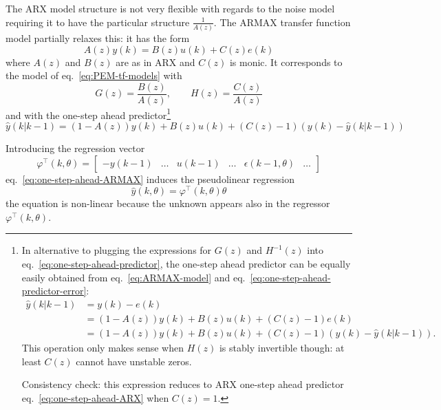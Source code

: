 The ARX model structure is not very flexible with regards to the noise model requiring it to have the particular structure $\frac{1}{A(z)}$. The ARMAX transfer function model partially relaxes this: it has the form
\begin{equation}
  \label{eq:ARMAX-model}
  A(z)y(k) = B(z)u(k) + C(z)e(k)
\end{equation}
where $A(z)$ and $B(z)$ are as in ARX and $C(z)$ is monic. It corresponds to the model of eq.~\eqref{eq:PEM-tf-models} with
\begin{equation*}
  G(z) = \frac{B(z)}{A(z)},\hspace{2em} H(z) = \frac{C(z)}{A(z)}
\end{equation*}
and with the one-step ahead predictor\footnote{In alternative to plugging the expressions for $G(z)$ and $H^{-1}(z)$ into eq.~\eqref{eq:one-step-ahead-predictor}, the one-step ahead predictor can be equally easily obtained from eq.~\eqref{eq:ARMAX-model} and eq.~\eqref{eq:one-step-ahead-predictor-error}:
  \begin{align*}
    \hat{y}(k|k-1) &= y(k) - e(k) \\
                   &=\left(1-A(z)\right)y(k) + B(z)u(k) + \left(C(z)-1\right)e(k) \\
                   &= \left(1-A(z)\right)y(k) + B(z)u(k) + \left(C(z)-1\right)\left(y(k)-\hat{y}(k|k-1)\right).
  \end{align*}
  This operation only makes sense when $H(z)$ is stably invertible though: at least $C(z)$ cannot have unstable zeros.

  Consistency check: this expression reduces to ARX one-step ahead predictor eq.~\eqref{eq:one-step-ahead-ARX} when $C(z)=1$.}
\begin{equation}
  \label{eq:one-step-ahead-ARMAX}
  \hat{y}(k|k-1) = (1-A(z))y(k) + B(z)u(k) + (C(z)-1)\left(y(k)-\hat{y}(k|k-1)\right)
\end{equation}

Introducing the regression vector
\begin{equation*}
  \varphi^\top(k,\theta) =
  \begin{bmatrix}
    -y(k-1) & \ldots & u(k-1) & \ldots & \epsilon(k-1,\theta) & \ldots
  \end{bmatrix}
\end{equation*}
eq.~\eqref{eq:one-step-ahead-ARMAX} induces the pseudolinear regression
\begin{equation}
  \label{eq:pseudolinear-regression-ARMAX}
  \hat{y}(k,\theta) = \varphi^\top(k,\theta) \theta
\end{equation}
the equation is non-linear because the unknown appears also in the regressor $\varphi^\top(k,\theta)$.

